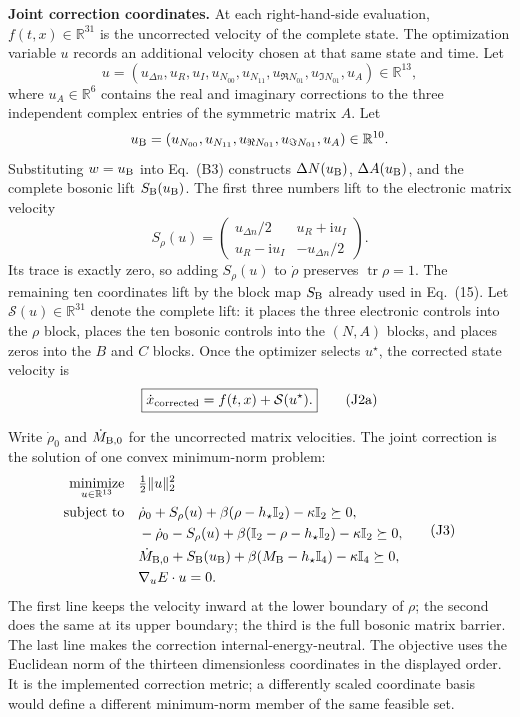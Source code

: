 \documentclass[10pt,letterpaper,twocolumn]{article}
\newcommand{\R}{\mathbb R}
\newcommand{\I}{\mathbb I}
\newcommand{\ii}{\mathrm i}
\begin{document}
\textbf{Joint correction coordinates.}
At each right-hand-side evaluation, \(f(t,x)\in\R^{31}\) is the uncorrected
velocity of the complete state.  The optimization variable \(u\) records an
additional velocity chosen at that same state and time.  Let
\[
u=(u_{\Delta n},u_R,u_I,
u_{N_{00}},u_{N_{11}},u_{\Re N_{01}},u_{\Im N_{01}},
u_A)\in\R^{13},
\]
where \(u_A\in\R^6\) contains the real and imaginary corrections to the three
independent complex entries of the symmetric matrix \(A\).  Let
\[
u_{\rm B}=(u_{N_{00}},u_{N_{11}},u_{\Re N_{01}},u_{\Im N_{01}},u_A)
\in\R^{10}.
\]
Substituting \(w=u_{\rm B}\) into Eq.~(B3) constructs
\(\Delta N(u_{\rm B})\), \(\Delta A(u_{\rm B})\), and the complete bosonic
lift \(S_{\rm B}(u_{\rm B})\).  The first three
numbers lift to the electronic matrix velocity
\[
S_\rho(u)=
\begin{pmatrix}
u_{\Delta n}/2 & u_R+\ii u_I\\
u_R-\ii u_I & -u_{\Delta n}/2
\end{pmatrix}.
\tag{J2}
\]
Its trace is exactly zero, so adding \(S_\rho(u)\) to \(\dot\rho\) preserves
\(\operatorname{tr}\rho=1\).  The remaining ten coordinates lift by the
block map \(S_{\rm B}\) already used in Eq.~(15).
Let \(\mathcal S(u)\in\R^{31}\) denote the complete lift: it places the three
electronic controls into the \(\rho\) block, places the ten bosonic controls
into the \((N,A)\) blocks, and places zeros into the \(B\) and \(C\) blocks.
Once the optimizer selects \(u^\star\), the corrected state velocity is
\[
\boxed{\dot x_{\rm corrected}=f(t,x)+\mathcal S(u^\star).}
\tag{J2a}
\]

Write \(\dot\rho_0\) and \(\dot M_{{\rm B},0}\) for the uncorrected matrix
velocities.  The joint correction is the solution of one convex
minimum-norm problem:
{\small
\[
\begin{aligned}
\underset{u\in\R^{13}}{\operatorname{minimize}}\quad
&\tfrac12\lVert u\rVert_2^2\\
\text{subject to}\quad
&\dot\rho_0+S_\rho(u)
 +\beta(\rho-h_\star\I_2)-\kappa\I_2\succeq0,\\
&-\dot\rho_0-S_\rho(u)
 +\beta(\I_2-\rho-h_\star\I_2)-\kappa\I_2\succeq0,\\
&\dot M_{{\rm B},0}+S_{\rm B}(u_{\rm B})
 +\beta(M_{\rm B}-h_\star\I_4)-\kappa\I_4\succeq0,\\
&\nabla_u E\cdot u=0.
\end{aligned}
\tag{J3}
\]
}
The first line keeps the velocity inward at the lower boundary of \(\rho\);
the second does the same at its upper boundary; the third is the full bosonic
matrix barrier.  The last line makes the correction internal-energy-neutral.
The objective uses the Euclidean norm of the thirteen dimensionless
coordinates in the displayed order.  It is the implemented correction metric;
a differently scaled coordinate basis would define a different minimum-norm
member of the same feasible set.
\end{document}
